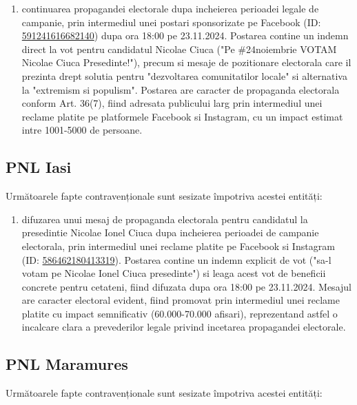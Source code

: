 \documentclass[a4paper,12pt]{article}
\begin{document}
\begin{enumerate}[leftmargin=*, label=\arabic*.)]
    \item continuarea propagandei electorale dupa incheierea perioadei legale de campanie, prin intermediul unei postari sponsorizate pe Facebook (ID: \href{https://www.facebook.com/ads/library/?id=591241616682140}{591241616682140}) dupa ora 18:00 pe 23.11.2024. Postarea contine un indemn direct la vot pentru candidatul Nicolae Ciuca ("Pe \#24noiembrie VOTAM Nicolae Ciuca Presedinte!"), precum si mesaje de pozitionare electorala care il prezinta drept solutia pentru "dezvoltarea comunitatilor locale" si alternativa la "extremism si populism". Postarea are caracter de propaganda electorala conform Art. 36(7), fiind adresata publicului larg prin intermediul unei reclame platite pe platformele Facebook si Instagram, cu un impact estimat intre 1001-5000 de persoane.
\end{enumerate}

\vspace{0.5cm}

\subsection{PNL Iasi}
Următoarele fapte contravenționale sunt sesizate împotriva acestei entități:

\begin{enumerate}[leftmargin=*, label=\arabic*.)]
    \item difuzarea unui mesaj de propaganda electorala pentru candidatul la presedintie Nicolae Ionel Ciuca dupa incheierea perioadei de campanie electorala, prin intermediul unei reclame platite pe Facebook si Instagram (ID: \href{https://www.facebook.com/ads/library/?id=586462180413319}{586462180413319}). Postarea contine un indemn explicit de vot ("sa-l votam pe Nicolae Ionel Ciuca presedinte") si leaga acest vot de beneficii concrete pentru cetateni, fiind difuzata dupa ora 18:00 pe 23.11.2024. Mesajul are caracter electoral evident, fiind promovat prin intermediul unei reclame platite cu impact semnificativ (60.000-70.000 afisari), reprezentand astfel o incalcare clara a prevederilor legale privind incetarea propagandei electorale.
\end{enumerate}

\vspace{0.5cm}

\subsection{PNL Maramures}
Următoarele fapte contravenționale sunt sesizate împotriva acestei entități:
\end{document}
